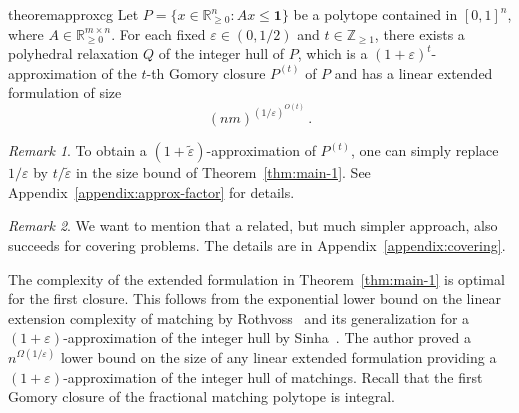 \documentclass[11pt]{article}
\newcommand{\fritztodo}[1]{\todo[backgroundcolor=cyantransparent, linecolor=cyan!80]{#1}}
\newcommand{\larstodo}[1]{\todo[backgroundcolor=pinktransparent, linecolor=pink!80]{#1}}
\newcommand{\jiayetodo}[1]{\todo[backgroundcolor=greentransparent, linecolor=green!80]{#1}}
\newcommand{\R}{\mathbb{R}}
\newcommand{\Z}{\mathbb{Z}}
\newcommand{\one}{\mathbf{1}}
\newcommand{\eps}{\varepsilon}
\newcommand{\numrounds}{t}
\renewcommand{\epsilon}{\varepsilon}
\theoremstyle{remark}
\newtheorem{remark}{Remark}
\begin{document}
\begin{restatable}{theorem}{approxcg}\label{thm:main-1}
    Let $P = \{x \in \R^n_{\ge 0} : Ax \le \one \}$ be a polytope contained in $[0,1]^n$, where $A \in \R_{\geq 0}^{m \times n}$. For each fixed $\eps \in (0,1/2)$ and $\numrounds\in \Z_{\geq 1}$, there exists a polyhedral relaxation $Q$ of the integer hull of $P$, which is a $(1+\eps)^\numrounds$-approximation of the $\numrounds$-th Gomory closure $P^{(t)}$ of $P$ and has a linear extended formulation of size
    \[
	    (nm)^{(1/\eps)^{O(\numrounds)}}\,.
    \]
  \end{restatable}
  \begin{remark}
    To obtain a $(1+\tilde{\eps})$-approximation of $P^{(t)}$, one can simply replace $1/\eps$ by $t/\tilde{\eps}$ in the size bound of Theorem~\ref{thm:main-1}. See Appendix~\ref{appendix:approx-factor} for details. %
  \end{remark}
  \begin{remark}
    We want to mention that a related, but much simpler approach, also succeeds for covering problems. The details are in  Appendix~\ref{appendix:covering}. 
  \end{remark}
\noindent 
The complexity of  the extended formulation in %
Theorem~\ref{thm:main-1} is optimal for the first closure. %
This follows from the exponential lower bound on the linear extension complexity of matching by Roth\-voss~\cite{rothvoss2017matching} and its generalization  for a $(1+\eps)$-approximation of the integer hull  by Sinha~\cite{sin18}. The author proved a $n^{\Omega(1/\eps)}$ lower bound on the size of any linear extended formulation providing a $(1+\eps)$-approximation of the integer hull of matchings. Recall that the first Gomory closure of the fractional matching polytope is integral. %
\end{document}

